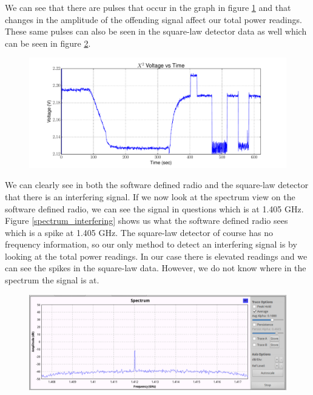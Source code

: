 {\begin{figure}[h!tb]
\label{sdr_unfilt_raw}
\end{figure}

We can see that there are pulses that occur in the graph in figure \ref{sdr_unfilt_raw} and that changes in the amplitude of the offending signal affect our total power readings.  These same pulses can also be seen in the square-law detector data as well which can be seen in figure \ref{x2_unfilt}.

\begin{figure}[h!tb] \centering

\includegraphics[width=\textwidth]{Experiments/Exp4/x2_voltage.pdf}

\label{x2_unfilt}
\end{figure}

We can clearly see in both the software defined radio and the square-law detector that there is an interfering signal.  If we now look at the spectrum view on the software defined radio, we can see the signal in questions which is at 1.405 GHz.  Figure \ref{spectrum_interfering} shows us what the software defined radio sees which is a spike at 1.405 GHz.  The square-law detector of course has no frequency information, so our only method to detect an interfering signal is by looking at the total power readings.  In our case there is elevated readings and we can see the spikes in the square-law data.  However, we do not know where in the spectrum the signal is at.

\begin{figure}[h!tb] \centering

\includegraphics[width=\textwidth]{Images/spectrum_interference.png}


\end{figure}}

